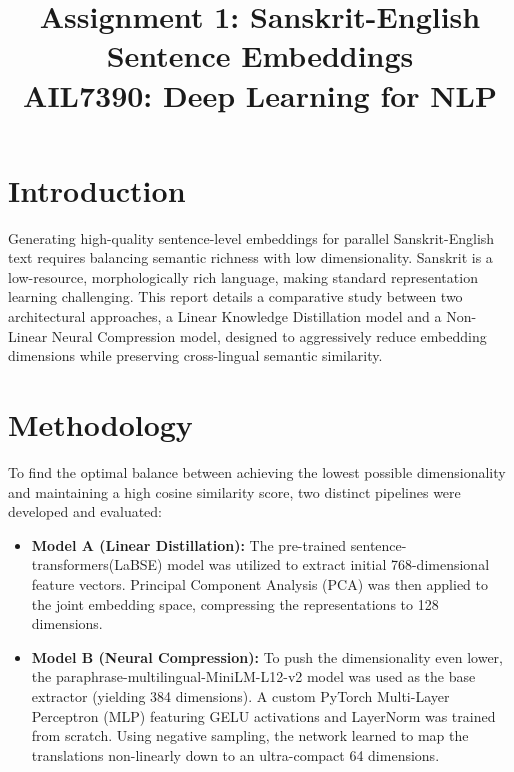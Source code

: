 \documentclass[11pt]{article}
\title{\textbf{Assignment 1: Sanskrit-English Sentence Embeddings}\\
\large AIL7390: Deep Learning for NLP}
\date{}
\begin{document}
\maketitle

\section{Introduction}
Generating high-quality sentence-level embeddings for parallel Sanskrit-English text requires balancing semantic richness with low dimensionality. Sanskrit is a low-resource, morphologically rich language, making standard representation learning challenging. This report details a comparative study between two architectural approaches, a Linear Knowledge Distillation model and a Non-Linear Neural Compression model, designed to aggressively reduce embedding dimensions while preserving cross-lingual semantic similarity.

\section{Methodology}
To find the optimal balance between achieving the lowest possible dimensionality and maintaining a high cosine similarity score, two distinct pipelines were developed and evaluated:

\begin{itemize}[leftmargin=*]
    \item \textbf{Model A (Linear Distillation):} The pre-trained sentence-transformers(LaBSE) model was utilized to extract initial 768-dimensional feature vectors. Principal Component Analysis (PCA) was then applied to the joint embedding space, compressing the representations to 128 dimensions.
    \item \textbf{Model B (Neural Compression):} To push the dimensionality even lower, the paraphrase-multilingual-MiniLM-L12-v2 model was used as the base extractor (yielding 384 dimensions). A custom PyTorch Multi-Layer Perceptron (MLP) featuring GELU activations and LayerNorm was trained from scratch. Using negative sampling, the network learned to map the translations non-linearly down to an ultra-compact 64 dimensions.
\end{itemize}
\end{document}
